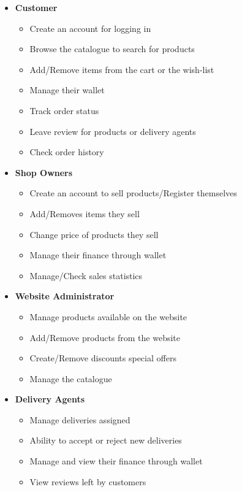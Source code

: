 \documentclass[12pt]{article}
\begin{document}
\begin{itemize}
    \item \textbf{Customer}

    \begin{itemize}
        \item Create an account for logging in
        \item Browse the catalogue to search for products
        \item Add/Remove items from the cart or the wish-list
        \item Manage their wallet
        \item Track order status
        \item Leave review for products or delivery agents
        \item Check order history
    \end{itemize}
    
    \item \textbf{Shop Owners}

    \begin{itemize}
        \item Create an account to sell products/Register themselves
        \item Add/Removes items they sell
        \item Change price of products they sell
        \item Manage their finance through wallet
        \item Manage/Check sales statistics
    \end{itemize}

    \item \textbf{Website Administrator}

    \begin{itemize}
        \item Manage products available on the website
        \item Add/Remove products from the website
        \item Create/Remove discounts special offers
        \item Manage the catalogue
    \end{itemize}
    
    \item \textbf{Delivery Agents}

    \begin{itemize}
        \item Manage deliveries assigned
        \item Ability to accept or reject new deliveries
        \item Manage and view their finance through wallet
        \item View reviews left by customers
    \end{itemize}


    
\end{itemize}
\end{document}
